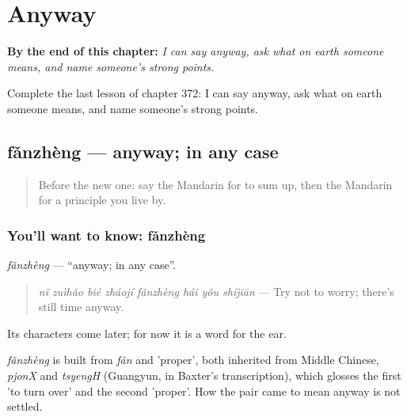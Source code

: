 
\chapter{Anyway}
\label{ch:zh-anyway}

\begin{chapteropening}
\textbf{By the end of this chapter:} \emph{I can say anyway, ask what on earth someone means, and name someone's strong points.}

Complete the last lesson of chapter 372: I can say anyway, ask what on earth someone means, and name someone's strong points.
\end{chapteropening}

\section[fǎnzhèng]{fǎnzhèng — anyway; in any case}

\label{lesson:ZH-C372-fanzheng}



\begin{quote}
Before the new one: say the Mandarin for to sum up, then the Mandarin for a principle you live by.
\end{quote}

\subsection*{You'll want to know: fǎnzhèng}
\emph{fǎnzhèng} — \textquotedblleft{}anyway; in any case\textquotedblright{}.

\begin{quote}
\emph{nǐ zuìhǎo bié zháojí fǎnzhèng hái yǒu shíjiān} — Try not to worry; there's still time anyway.
\end{quote}

Its characters come later; for now it is a word for the ear.

\begin{cousinweb}
\emph{fǎnzhèng} is built from \emph{fǎn} and  'proper', both inherited from Middle Chinese, \emph{pjonX} and \emph{tsyengH} (Guangyun, in Baxter's transcription), which glosses the first 'to turn over' and the second 'proper'. How the pair came to mean anyway is not settled.
\end{cousinweb}

